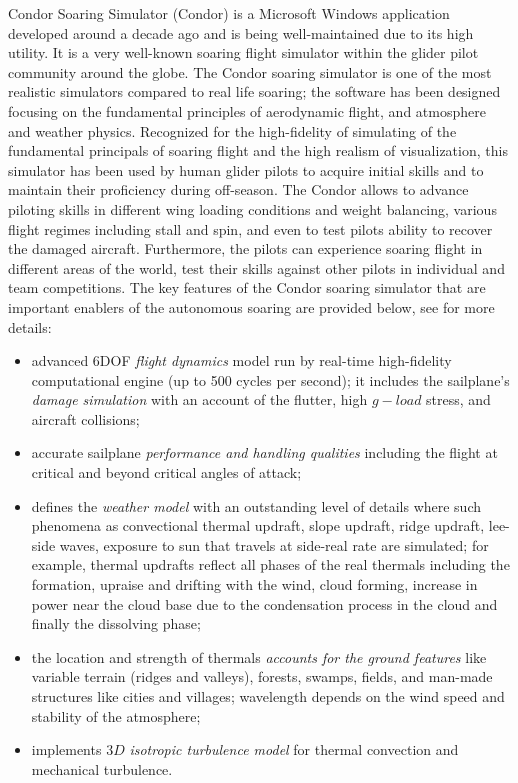 \documentclass[letterpaper, 10 pt, conference]{ieeeconf}  %
\begin{document}
Condor Soaring Simulator (Condor) is a Microsoft Windows application developed around a decade ago and is being well-maintained due to its high utility. It is a very well-known soaring flight simulator within the glider pilot community around the globe. The Condor soaring simulator is one of the most realistic simulators compared to real life soaring; the software has been designed focusing on the fundamental principles of aerodynamic flight, and atmosphere and weather physics. Recognized for the high-fidelity of simulating of the fundamental principals of soaring flight and the high realism of visualization, this simulator has been used by human glider pilots to acquire initial skills and to maintain their proficiency during off-season. The Condor allows to advance piloting skills in different wing loading conditions and weight balancing, various flight regimes including stall and spin, and even to test pilots ability to recover the damaged aircraft. Furthermore, the pilots can experience soaring flight in different areas of the world, test their skills against other pilots in individual and team competitions. The key features of the Condor soaring simulator that are important enablers of the autonomous soaring are provided below, see \cite{Condor:2013:Online} for more details:
\begin{itemize}
  \item advanced 6DOF \emph{flight dynamics} model run by real-time high-fidelity computational engine (up to 500 cycles per second); it includes the sailplane's \emph{damage simulation} with an account of the flutter, high $g-load$ stress, and aircraft collisions;
  \item accurate sailplane \emph{performance and handling qualities} including the flight at critical and beyond critical angles of attack;
  \item defines the \emph{weather model} with an outstanding level of details where such phenomena as convectional thermal updraft, slope updraft, ridge updraft, lee-side waves, exposure to sun that travels at side-real rate are simulated; for example, thermal updrafts reflect all phases of the real thermals including the formation, upraise and drifting with the wind, cloud forming, increase in power near the cloud base due to the condensation process in the cloud and finally the dissolving phase;
  \item the location and strength of thermals \emph{accounts for the ground features} like variable terrain (ridges and valleys), forests, swamps, fields, and man-made structures like cities and villages; wavelength depends on the wind speed and stability of the atmosphere;
  \item implements $3D$ \emph{isotropic turbulence model} for thermal convection       and mechanical turbulence.
\end{itemize}
\end{document}
